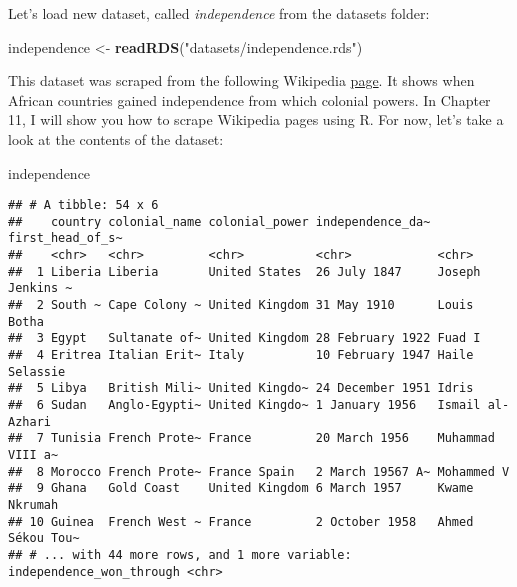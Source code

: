 \documentclass[
]{article}
\newenvironment{Shaded}{\begin{snugshade}}{\end{snugshade}}
\newcommand{\KeywordTok}[1]{\textcolor[rgb]{0.13,0.29,0.53}{\textbf{#1}}}
\newcommand{\NormalTok}[1]{#1}
\newcommand{\StringTok}[1]{\textcolor[rgb]{0.31,0.60,0.02}{#1}}
\begin{document}
Let's load new dataset, called \emph{independence} from the datasets folder:

\begin{Shaded}
\begin{Highlighting}[]
\NormalTok{independence \textless{}{-}}\StringTok{ }\KeywordTok{readRDS}\NormalTok{(}\StringTok{"datasets/independence.rds"}\NormalTok{)}
\end{Highlighting}
\end{Shaded}

This dataset was scraped from the following Wikipedia \href{https://en.wikipedia.org/wiki/Decolonisation_of_Africa\#Timeline}{page}.
It shows when African countries gained independence from which colonial powers. In Chapter 11, I
will show you how to scrape Wikipedia pages using R. For now, let's take a look at the contents
of the dataset:

\begin{Shaded}
\begin{Highlighting}[]
\NormalTok{independence}
\end{Highlighting}
\end{Shaded}

\begin{verbatim}
## # A tibble: 54 x 6
##    country colonial_name colonial_power independence_da~ first_head_of_s~
##    <chr>   <chr>         <chr>          <chr>            <chr>           
##  1 Liberia Liberia       United States  26 July 1847     Joseph Jenkins ~
##  2 South ~ Cape Colony ~ United Kingdom 31 May 1910      Louis Botha     
##  3 Egypt   Sultanate of~ United Kingdom 28 February 1922 Fuad I          
##  4 Eritrea Italian Erit~ Italy          10 February 1947 Haile Selassie  
##  5 Libya   British Mili~ United Kingdo~ 24 December 1951 Idris           
##  6 Sudan   Anglo-Egypti~ United Kingdo~ 1 January 1956   Ismail al-Azhari
##  7 Tunisia French Prote~ France         20 March 1956    Muhammad VIII a~
##  8 Morocco French Prote~ France Spain   2 March 19567 A~ Mohammed V      
##  9 Ghana   Gold Coast    United Kingdom 6 March 1957     Kwame Nkrumah   
## 10 Guinea  French West ~ France         2 October 1958   Ahmed Sékou Tou~
## # ... with 44 more rows, and 1 more variable: independence_won_through <chr>
\end{verbatim}
\end{document}
